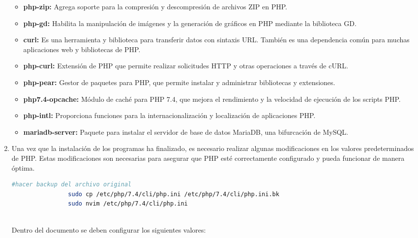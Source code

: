 \begin{enumerate}
\begin{itemize}
					\item \textbf{php-zip:} Agrega soporte para la compresión y descompresión de archivos ZIP en PHP.
					
					\item \textbf{php-gd:} Habilita la manipulación de imágenes y la generación de gráficos en PHP mediante la biblioteca GD.
					
					\item \textbf{curl:} Es una herramienta y biblioteca para transferir datos con sintaxis URL. También es una dependencia común para muchas aplicaciones web y bibliotecas de PHP.
					
					\item \textbf{php-curl:} Extensión de PHP que permite realizar solicitudes HTTP y otras operaciones a través de cURL.
					
					\item \textbf{php-pear:} Gestor de paquetes para PHP, que permite instalar y administrar bibliotecas y extensiones.
					
					\item \textbf{php7.4-opcache:} Módulo de caché para PHP 7.4, que mejora el rendimiento y la velocidad de ejecución de los scripts PHP.
					
					\item \textbf{php-intl:} Proporciona funciones para la internacionalización y localización de aplicaciones PHP.
					
					\item \textbf{mariadb-server:} Paquete para instalar el servidor de base de datos MariaDB, una bifurcación de MySQL.
			
				\end{itemize}
		
				\item Una vez que la instalación de los programas ha finalizado, es necesario realizar algunas modificaciones en los valores predeterminados de PHP. Estas modificaciones son necesarias para asegurar que PHP esté correctamente configurado y pueda funcionar de manera óptima.
				
			
				\begin{lstlisting}[language=Bash,caption=Editar php]
				#hacer backup del archivo original
				sudo cp /etc/php/7.4/cli/php.ini /etc/php/7.4/cli/php.ini.bk
				sudo nvim /etc/php/7.4/cli/php.ini
				
				\end{lstlisting}
				Dentro del documento se deben configurar los siguientes valores:
						

\end{enumerate}
